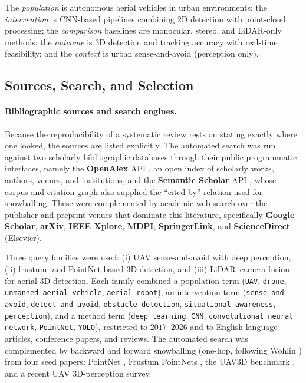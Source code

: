 The \emph{population} is autonomous aerial vehicles in urban environments; the
\emph{intervention} is CNN-based pipelines combining 2D detection with
point-cloud processing; the \emph{comparison} baselines are monocular, stereo,
and LiDAR-only methods; the \emph{outcome} is 3D detection and tracking accuracy
with real-time feasibility; and the \emph{context} is urban sense-and-avoid
(perception only).

\subsection{Sources, Search, and Selection}
\label{sec:slr_sources}

\paragraph*{Bibliographic sources and search engines.} Because the
reproducibility of a systematic review rests on stating exactly where one looked,
the sources are listed explicitly. The automated search was run against two
scholarly bibliographic databases through their public programmatic interfaces,
namely the \textbf{OpenAlex} API \cite{priem2022openalex}, an open index of
scholarly works, authors, venues, and institutions, and the \textbf{Semantic
Scholar} API \cite{lo2020s2orc}, whose corpus and citation graph also supplied
the ``cited by'' relation used for snowballing. These were complemented by
academic web search over the publisher and preprint venues that dominate this
literature, specifically \textbf{Google Scholar}, \textbf{arXiv},
\textbf{IEEE Xplore}, \textbf{MDPI}, \textbf{SpringerLink}, and
\textbf{ScienceDirect} (Elsevier).

Three query families were used: (i) UAV sense-and-avoid with deep perception,
(ii) frustum- and PointNet-based 3D detection, and (iii) LiDAR--camera fusion for
aerial 3D detection. Each family combined a population term (\texttt{UAV},
\texttt{drone}, \texttt{unmanned aerial vehicle}, \texttt{aerial robot}), an
intervention term (\texttt{sense and avoid}, \texttt{detect and avoid},
\texttt{obstacle detection}, \texttt{situational awareness}, \texttt{perception}),
and a method term (\texttt{deep learning}, \texttt{CNN}, \texttt{convolutional
neural network}, \texttt{PointNet}, \texttt{YOLO}), restricted to
$2017$--$2026$ and to English-language articles, conference papers, and reviews.
The automated search was complemented by backward and forward snowballing
(one-hop, following Wohlin \cite{wohlin2014snowball}) from four seed papers:
PointNet \cite{qi2017pointnet}, Frustum PointNets \cite{qi2018frustum}, the UAV3D
benchmark \cite{ye2024uav3d}, and a recent UAV 3D-perception survey.

